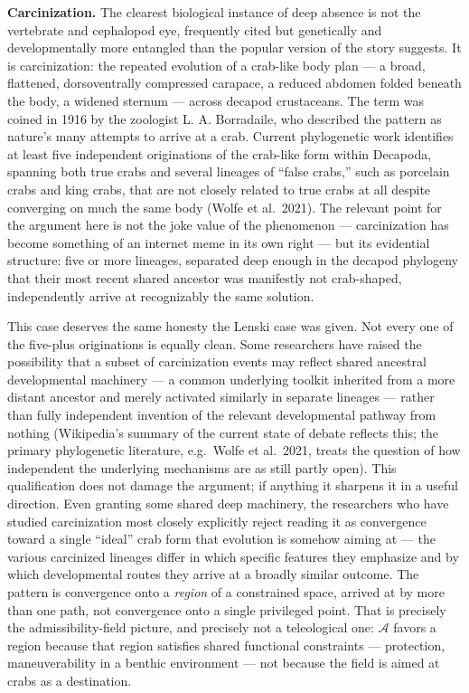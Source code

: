 \documentclass[11pt]{article}
\theoremstyle{plain}
\begin{document}
\textbf{Carcinization.} The clearest biological instance of deep absence is not the vertebrate and cephalopod eye, frequently cited but genetically and developmentally more entangled than the popular version of the story suggests. It is carcinization: the repeated evolution of a crab-like body plan --- a broad, flattened, dorsoventrally compressed carapace, a reduced abdomen folded beneath the body, a widened sternum --- across decapod crustaceans. The term was coined in 1916 by the zoologist L. A. Borradaile, who described the pattern as nature's many attempts to arrive at a crab. Current phylogenetic work identifies at least five independent originations of the crab-like form within Decapoda, spanning both true crabs and several lineages of ``false crabs,'' such as porcelain crabs and king crabs, that are not closely related to true crabs at all despite converging on much the same body (Wolfe et al.~2021). The relevant point for the argument here is not the joke value of the phenomenon --- carcinization has become something of an internet meme in its own right --- but its evidential structure: five or more lineages, separated deep enough in the decapod phylogeny that their most recent shared ancestor was manifestly not crab-shaped, independently arrive at recognizably the same solution.

This case deserves the same honesty the Lenski case was given. Not every one of the five-plus originations is equally clean. Some researchers have raised the possibility that a subset of carcinization events may reflect shared ancestral developmental machinery --- a common underlying toolkit inherited from a more distant ancestor and merely activated similarly in separate lineages --- rather than fully independent invention of the relevant developmental pathway from nothing (Wikipedia's summary of the current state of debate reflects this; the primary phylogenetic literature, e.g.~Wolfe et al.~2021, treats the question of how independent the underlying mechanisms are as still partly open). This qualification does not damage the argument; if anything it sharpens it in a useful direction. Even granting some shared deep machinery, the researchers who have studied carcinization most closely explicitly reject reading it as convergence toward a single ``ideal'' crab form that evolution is somehow aiming at --- the various carcinized lineages differ in which specific features they emphasize and by which developmental routes they arrive at a broadly similar outcome. The pattern is convergence onto a \emph{region} of a constrained space, arrived at by more than one path, not convergence onto a single privileged point. That is precisely the admissibility-field picture, and precisely not a teleological one: \(\mathcal{A}\) favors a region because that region satisfies shared functional constraints --- protection, maneuverability in a benthic environment --- not because the field is aimed at crabs as a destination.
\end{document}
